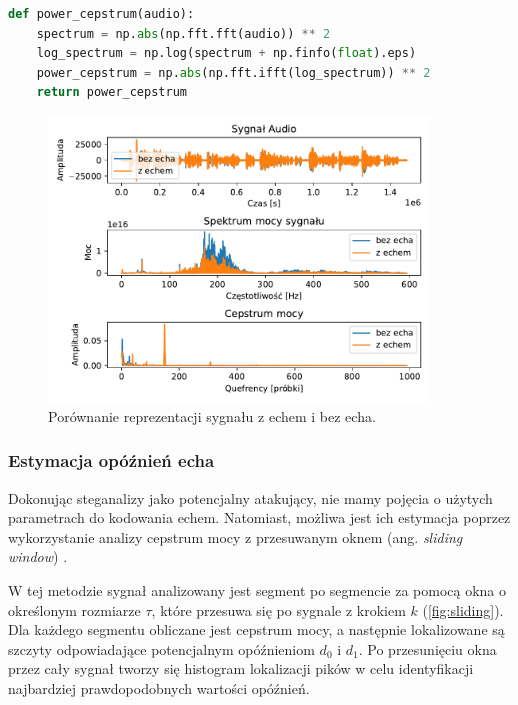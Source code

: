 \begin{lstlisting}[language=Python, caption={Fragment kodu liczącego cepstrum mocy.}]
def power_cepstrum(audio):
    spectrum = np.abs(np.fft.fft(audio)) ** 2
    log_spectrum = np.log(spectrum + np.finfo(float).eps)
    power_cepstrum = np.abs(np.fft.ifft(log_spectrum)) ** 2
    return power_cepstrum
\end{lstlisting}

\begin{figure}[ht!]
	\centering
	\includegraphics[width=0.9\textwidth]{./img/plot_echo_signal_spectrum_cepstrum.pdf}
	\caption{Porównanie reprezentacji sygnału z echem i bez echa.}
\end{figure}

\subsubsection{Estymacja opóźnień echa}

Dokonując steganalizy jako potencjalny atakujący, nie mamy pojęcia o użytych parametrach do kodowania echem. Natomiast, możliwa jest ich estymacja poprzez wykorzystanie analizy cepstrum mocy z przesuwanym oknem (ang. \textit{sliding window}) \cite{echo_swc}.

W tej metodzie sygnał analizowany jest segment po segmencie za pomocą okna o określonym rozmiarze $\tau$, które przesuwa się po sygnale z krokiem $k$ (\ref{fig:sliding}). Dla każdego segmentu obliczane jest cepstrum mocy, a następnie lokalizowane są szczyty odpowiadające potencjalnym opóźnieniom $d_0$ i $d_1$. Po przesunięciu okna przez cały sygnał tworzy się histogram lokalizacji pików w celu identyfikacji najbardziej prawdopodobnych wartości opóźnień.

